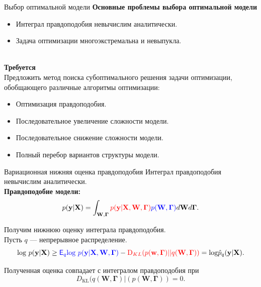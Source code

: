 \documentclass[usenames,dvipsnames,11pt,pdf,utf8,russian,aspectratio=169]{beamer}
\begin{document}
\begin{frame}{Выбор оптимальной модели}
\textbf{Основные проблемы выбора оптимальной модели}\\
\begin{itemize}
\item Интеграл правдоподобия невычислим аналитически.
\item Задача оптимизации многоэкстремальна и невыпукла.
\end{itemize}
~\\
\textbf{Требуется}\\ 
Предложить метод поиска субоптимального решения задачи оптимизации, обобщающего различные алгоритмы оптимизации:
\begin{itemize}
\item Оптимизация правдоподобия.
\item Последовательное увеличение сложности модели.
\item Последовательное снижение сложности модели.
\item Полный перебор вариантов структуры модели.
\end{itemize}

\end{frame}       


                                                                                                                                   
                                                                                                                                    

\begin{frame}{Вариационная нижняя оценка правдоподобия} 
Интеграл правдоподобия невычислим аналитически.\\
\textbf{Правдоподобие модели:}
\[
p(\mathbf{y}|\mathbf{X}) =
 \int_{\mathbf{W}, \boldsymbol{\Gamma} } \textcolor{red}{p(\mathbf{y}|\mathbf{X},\mathbf{W},  \boldsymbol{\Gamma})} \textcolor{blue}{p(\mathbf{W}, \boldsymbol{\Gamma})}d\mathbf{W}d{\boldsymbol{\Gamma}}.                         
\]

Получим нижнюю оценку интеграла правдоподобия.\\
Пусть $q$ --- непрерывное распределение.
$$                                                                                                                                              
        \text{log}~p(\mathbf{y}|\mathbf{X}) \geq 
\textcolor{blue}{\mathsf{E}_q \text{log}~{p(\mathbf{y} | \mathbf{X}, \mathbf{W}, \boldsymbol{\Gamma})}} - \textcolor{red}{\text{D}_{KL}(p(\mathbf{w}, \boldsymbol{\Gamma}) || q(\mathbf{W}, \boldsymbol{\Gamma}))} = \text{log}\hat{{p}}_q(\mathbf{y}|\mathbf{X}).
$$ 

Полученная оценка совпадает с интегралом правдоподобия при $$D_\text{KL}(q(\mathbf{W}, \boldsymbol{\Gamma})|(p(\mathbf{W}, \boldsymbol{\Gamma}))=0.$$

\end{frame}      
   
\end{document}
